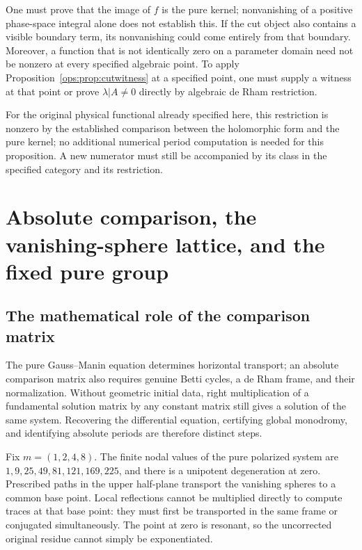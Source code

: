 \documentclass[11pt,a4paper,oneside]{article}
\theoremstyle{plain}
\theoremstyle{definition}
\theoremstyle{remark}
\numberwithin{equation}{section}
\begin{document}
One must prove that the image of $f$ is the pure kernel; nonvanishing of a positive phase-space integral alone does not establish this.
If the cut object also contains a visible boundary term, its nonvanishing could come entirely from that boundary.
Moreover, a function that is not identically zero on a parameter domain need not be nonzero at every specified algebraic point.
To apply Proposition~\ref{ops:prop:cutwitness} at a specified point, one must supply a witness at that point
or prove $\lambda|A\ne0$ directly by algebraic de Rham restriction.

For the original physical functional already specified here, this restriction is nonzero by the established comparison between the holomorphic form and the pure kernel;
no additional numerical period computation is needed for this proposition. A new numerator must still be accompanied by its class in the specified category and its restriction.


\endgroup


\section{Absolute comparison, the vanishing-sphere lattice, and the fixed pure group}\label{ch:comparison}\label{ch:lattice}\label{ch:fixed}\label{ch:coaction}

\begingroup


\subsection{The mathematical role of the comparison matrix}
The pure Gauss--Manin equation determines horizontal transport; an absolute comparison matrix also requires genuine Betti cycles, a de Rham frame, and their normalization. Without geometric initial data, right multiplication of a fundamental solution matrix by any constant matrix still gives a solution of the same system. Recovering the differential equation, certifying global monodromy, and identifying absolute periods are therefore distinct steps.

Fix $m=(1,2,4,8)$. The finite nodal values of the pure polarized system are $1,9,25,49,81,121,169,225$, and there is a unipotent degeneration at zero. Prescribed paths in the upper half-plane transport the vanishing spheres to a common base point. Local reflections cannot be multiplied directly to compute traces at that base point: they must first be transported in the same frame or conjugated simultaneously. The point at zero is resonant, so the uncorrected original residue cannot simply be exponentiated.
\end{document}
